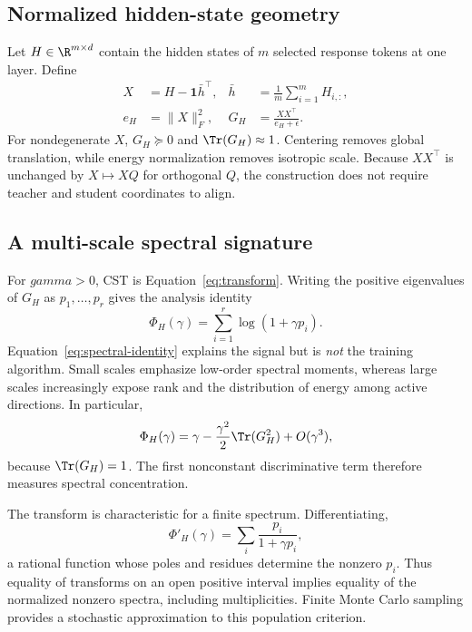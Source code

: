 \documentclass{article}
\newcommand{\cst}{\textsc{CST}}
\begin{document}
\subsection{Normalized hidden-state geometry}

Let $H\in\R^{m\times d}$ contain the hidden states of $m$ selected response
tokens at one layer.  Define
\begin{align}
  X &= H-\mathbf{1}\bar h^\top, &
  \bar h &= \frac{1}{m}\sum_{i=1}^m H_{i,:},\\
  e_H &= \lVert X\rVert_F^2, &
  G_H &= \frac{XX^\top}{e_H+\epsilon}.
  \label{eq:gram}
\end{align}
For nondegenerate $X$, $G_H\succeq0$ and $\Tr(G_H)\approx1$.  Centering
removes global translation, while energy normalization removes isotropic
scale.  Because $XX^\top$ is unchanged by $X\mapsto XQ$ for orthogonal $Q$,
the construction does not require teacher and student coordinates to align.

\subsection{A multi-scale spectral signature}

For $gamma>0$, \cst{} is Equation~\ref{eq:transform}.  Writing the positive
eigenvalues of $G_H$ as $p_1,\ldots,p_r$ gives the analysis identity
\begin{equation}
  \Phi_H(\gamma)=\sum_{i=1}^{r}\log(1+\gamma p_i).
  \label{eq:spectral-identity}
\end{equation}
Equation~\ref{eq:spectral-identity} explains the signal but is \emph{not} the
training algorithm.  Small scales emphasize low-order spectral moments,
whereas large scales increasingly expose rank and the distribution of energy
among active directions.  In particular,
\begin{equation}
 \Phi_H(\gamma)
 =\gamma-\frac{\gamma^2}{2}\Tr(G_H^2)+O(\gamma^3),
 \label{eq:taylor}
\end{equation}
because $\Tr(G_H)=1$.  The first nonconstant discriminative term therefore
measures spectral concentration.

The transform is characteristic for a finite spectrum.  Differentiating,
\begin{equation}
 \Phi'_H(\gamma)=\sum_i\frac{p_i}{1+\gamma p_i},
\end{equation}
a rational function whose poles and residues determine the nonzero $p_i$.
Thus equality of transforms on an open positive interval implies equality of
the normalized nonzero spectra, including multiplicities.  Finite Monte Carlo
sampling provides a stochastic approximation to this population criterion.
\end{document}
